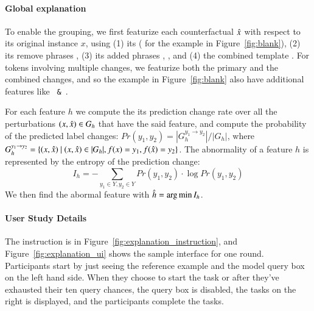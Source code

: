 \paragraph{Global explanation}
To enable the grouping, we first featurize each counterfactual $\hat{x}$ with respect to its original instance $x$, using 
(1) its \tagstr ( for the example in Figure~\ref{fig:blank}), 
(2) its remove phrases , 
(3) its added phrases , , and 
(4) the combined template .
For tokens involving multiple changes, we featurize both the primary and the combined changes, and so the example in Figure~\ref{fig:blank} also have additional features like \texttt{ \& }.

For each feature $h$ we compute the its prediction change rate over all the perturbations $(x, \hat{x}) \in G_{h}$ that have the said feature, and compute the probability of the predicted label changes: $Pr(y_1, y_2) = |G_h^{y_1\rightarrow y_2}|/|G_h|$, where $ G_h^{y_1\rightarrow y_2} = \{ (x, \xp)\ |\ (x, \xp) \in |G_h|, f(x)=y_1, f(\xp) = y_2 \}$.
The abnormality of a feature $h$ is represented by the entropy of the prediction change:
$$I_h = -\sum_{y_1 \in Y, y_2 \in Y} Pr(y_1, y_2) \cdot \log Pr(y_1, y_2)$$
We then find the abormal feature with $\hat{h} = \operatorname*{arg\,min} I_h$.



\paragraph{User Study Details}

The instruction is in Figure~\ref{fig:explanation_instruction}, and Figure~\ref{fig:explanation_ui} shows the sample interface for one round. 
Participants start by just seeing the reference example and the model query box on the left hand side.
When they choose to start the task or after they've exhausted their ten query chances, the query box is disabled, the tasks on the right is displayed, and the participants complete the tasks.